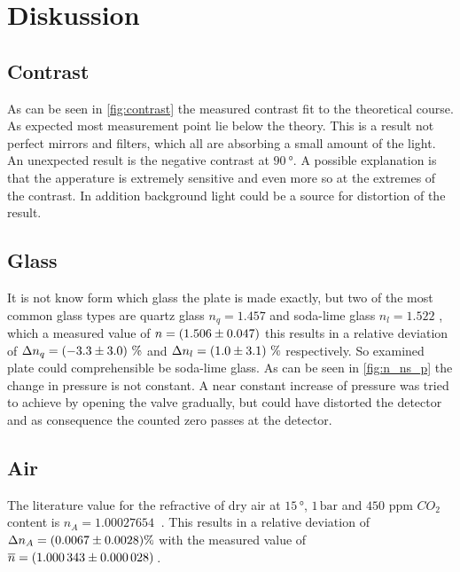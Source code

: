 \section{Diskussion}
\label{sec:Diskussion}

\subsection{Contrast}

As can be seen in \autoref{fig:contrast} the measured contrast fit to the theoretical course.
As expected most measurement point lie below the theory. 
This is a result not perfect mirrors and filters, which all are absorbing a small amount of the light.
An unexpected result is the negative contrast at $\SI{90}{\degree}$.
A possible explanation is that the apperature is extremely sensitive and even more so at the extremes of the contrast.
In addition background light could be a source for distortion of the result.

\subsection{Glass}

It is not know form which glass the plate is made exactly, but two of the most common glass types are quartz glass $n_{q} = 1.457$\cite{Malitson:65} and soda-lime glass $n_{l} = 1.522$ \cite{RUBIN1985275},
which a measured value of $n = \SI{1.506 \pm 0.047}{}$ this results in a relative deviation of $\Delta n_q = \SI{-3.3 \pm 3.0} \,\%$ and
$\Delta n_l = \SI{1.0 \pm 3.1}\,\%$ respectively. 
So examined plate could comprehensible be soda-lime glass.
As can be seen in \autoref{fig:n_ns_p} the change in pressure is not constant. 
A near constant increase of pressure was tried to achieve by opening the valve gradually, but could have distorted the detector and as consequence the counted zero passes at the detector.

\subsection{Air}

The literature value for the refractive of dry air at $15\, \unit{\degree}$, $1\, \unit{\bar}$ and $450$ ppm $CO_{2}$ content is $n_{A} = \SI{1.00027654}{}$ \cite{Ciddor:96}.
This results in a relative deviation of  $\Delta n_{A} = \SI{0.0067 \pm 0.0028}{} \%$ with the measured value of $\overline{n} = \SI{1.000343 \pm 0.000028}{}\,$. 